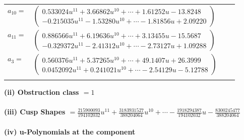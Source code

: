 \documentclass[1p]{elsarticle_modified}
\theoremstyle{definition}
\begin{document}
\begin{tabular}{m{7pt} m{180pt} m{7pt} m{180pt} }
\flushright $a_{10}=$&$\begin{pmatrix}0.533024 u^{11}+3.66862 u^{10}+\cdots+1.61252 u-13.8248\\-0.215035 u^{11}-1.53280 u^{10}+\cdots-1.81856 u+2.09220\end{pmatrix}$ \\
\flushright $a_{11}=$&$\begin{pmatrix}0.886566 u^{11}+6.19636 u^{10}+\cdots+3.13455 u-15.5687\\-0.329372 u^{11}-2.41312 u^{10}+\cdots-2.73127 u+1.09288\end{pmatrix}$ \\
\flushright $a_{3}=$&$\begin{pmatrix}0.560376 u^{11}+5.37265 u^{10}+\cdots+49.1407 u+26.3999\\0.0452092 u^{11}+0.241021 u^{10}+\cdots-2.54129 u-5.12788\end{pmatrix}$\\&\end{tabular}
\flushleft \textbf{(ii) Obstruction class $= 1$}\\~\\
\flushleft \textbf{(iii) Cusp Shapes $= \frac{215900093}{194102032} u^{11}+\frac{3183931527}{388204064} u^{10}+\cdots-\frac{1918294387}{194102032} u-\frac{8300245477}{388204064}$}\\~\\
\newpage\renewcommand{\arraystretch}{1}
\flushleft \textbf{(iv) u-Polynomials at the component}\newline \\
\end{document}
